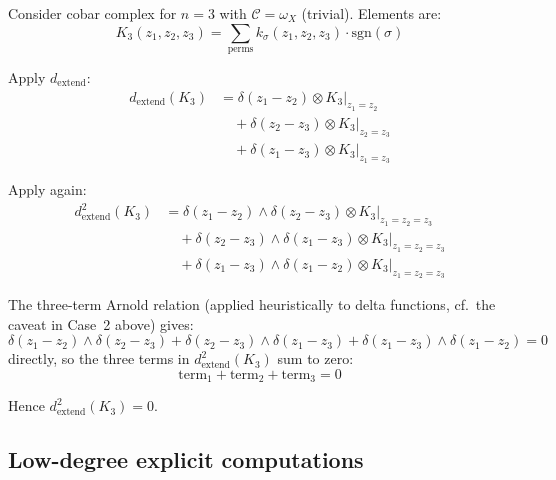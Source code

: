 \begin{example}\label{ex:three-point-signs-cobar}
Consider cobar complex for $n=3$ with $\mathcal{C} = \omega_X$ (trivial). Elements are:
\[K_3(z_1, z_2, z_3) = \sum_{\text{perms}} k_\sigma(z_1, z_2, z_3) \cdot 
\text{sgn}(\sigma)\]

Apply $d_{\text{extend}}$:
\begin{align*}
d_{\text{extend}}(K_3) &= \delta(z_1 - z_2) \otimes K_3|_{z_1=z_2} \\
&\quad + \delta(z_2 - z_3) \otimes K_3|_{z_2=z_3} \\
&\quad + \delta(z_1 - z_3) \otimes K_3|_{z_1=z_3}
\end{align*}

Apply again:
\begin{align*}
d_{\text{extend}}^2(K_3) &= \delta(z_1 - z_2) \wedge \delta(z_2 - z_3) \otimes 
K_3|_{z_1=z_2=z_3} \\
&\quad + \delta(z_2 - z_3) \wedge \delta(z_1 - z_3) \otimes K_3|_{z_1=z_2=z_3} \\
&\quad + \delta(z_1 - z_3) \wedge \delta(z_1 - z_2) \otimes K_3|_{z_1=z_2=z_3}
\end{align*}

The three-term Arnold relation (applied heuristically to delta functions, cf.\ the caveat in Case~2 above) gives:
\[\delta(z_1 - z_2) \wedge \delta(z_2 - z_3) + \delta(z_2 - z_3) \wedge \delta(z_1 - z_3) + \delta(z_1 - z_3) \wedge \delta(z_1 - z_2) = 0\]
directly, so the three terms in $d_{\text{extend}}^2(K_3)$ sum to zero:
\[\text{term}_1 + \text{term}_2 + \text{term}_3 = 0\]

Hence $d_{\text{extend}}^2(K_3) = 0$.
\end{example}

\subsection{Low-degree explicit computations}

